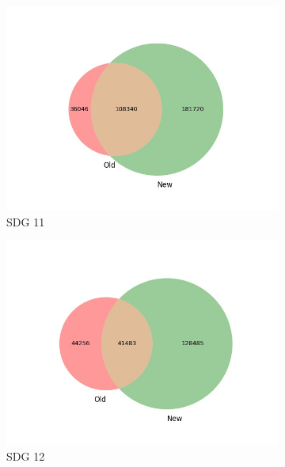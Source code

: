 \documentclass{article}
\begin{document}
\begin{figure}[H]
\begin{subfigure}{0.24\textwidth}
        \includegraphics[width=\textwidth]{figures/aurora-elsevier-venn/venn_sdg_11.jpg}
	    \caption{SDG 11}
    \end{subfigure}
    \hfill
    \begin{subfigure}{0.24\textwidth}
        \centering
        \includegraphics[width=\textwidth]{figures/aurora-elsevier-venn/venn_sdg_12.jpg}
	    \caption{SDG 12}
    \end{subfigure}
        \begin{subfigure}{0.24\textwidth}
        \centering

\end{subfigure}
\end{figure}
\end{document}
